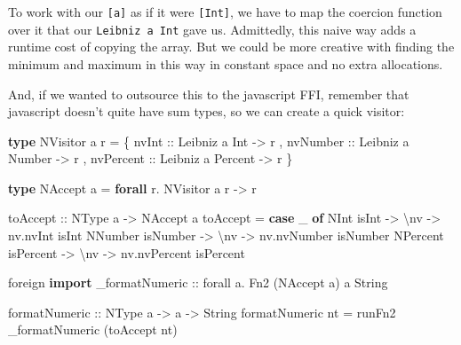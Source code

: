 \documentclass[]{article}
\newenvironment{Shaded}{}{}
\newcommand{\DataTypeTok}[1]{\textcolor[rgb]{0.56,0.13,0.00}{#1}}
\newcommand{\KeywordTok}[1]{\textcolor[rgb]{0.00,0.44,0.13}{\textbf{#1}}}
\newcommand{\NormalTok}[1]{#1}
\newcommand{\OperatorTok}[1]{\textcolor[rgb]{0.40,0.40,0.40}{#1}}
\newcommand{\OtherTok}[1]{\textcolor[rgb]{0.00,0.44,0.13}{#1}}
\begin{document}
To work with our \texttt{{[}a{]}} as if it were \texttt{{[}Int{]}}, we have to
map the coercion function over it that our \texttt{Leibniz\ a\ Int} gave us.
Admittedly, this naive way adds a runtime cost of copying the array. But we
could be more creative with finding the minimum and maximum in this way in
constant space and no extra allocations.

And, if we wanted to outsource this to the javascript FFI, remember that
javascript doesn't quite have sum types, so we can create a quick visitor:

\begin{Shaded}
\begin{Highlighting}[]
\KeywordTok{type} \DataTypeTok{NVisitor}\NormalTok{ a r }\OtherTok{=}
\NormalTok{    \{}\OtherTok{ nvInt ::} \DataTypeTok{Leibniz}\NormalTok{ a }\DataTypeTok{Int} \OtherTok{{-}\textgreater{}}\NormalTok{ r}
\NormalTok{    ,}\OtherTok{ nvNumber ::} \DataTypeTok{Leibniz}\NormalTok{ a }\DataTypeTok{Number} \OtherTok{{-}\textgreater{}}\NormalTok{ r}
\NormalTok{    ,}\OtherTok{ nvPercent ::} \DataTypeTok{Leibniz}\NormalTok{ a }\DataTypeTok{Percent} \OtherTok{{-}\textgreater{}}\NormalTok{ r}
\NormalTok{    \}}

\KeywordTok{type} \DataTypeTok{NAccept}\NormalTok{ a }\OtherTok{=} \KeywordTok{forall}\NormalTok{ r}\OperatorTok{.} \DataTypeTok{NVisitor}\NormalTok{ a r }\OtherTok{{-}\textgreater{}}\NormalTok{ r}

\OtherTok{toAccept ::} \DataTypeTok{NType}\NormalTok{ a }\OtherTok{{-}\textgreater{}} \DataTypeTok{NAccept}\NormalTok{ a}
\NormalTok{toAccept }\OtherTok{=} \KeywordTok{case}\NormalTok{ \_ }\KeywordTok{of}
    \DataTypeTok{NInt}\NormalTok{ isInt }\OtherTok{{-}\textgreater{}}\NormalTok{ \textbackslash{}nv }\OtherTok{{-}\textgreater{}}\NormalTok{ nv}\OperatorTok{.}\NormalTok{nvInt isInt}
    \DataTypeTok{NNumber}\NormalTok{ isNumber }\OtherTok{{-}\textgreater{}}\NormalTok{ \textbackslash{}nv }\OtherTok{{-}\textgreater{}}\NormalTok{ nv}\OperatorTok{.}\NormalTok{nvNumber isNumber}
    \DataTypeTok{NPercent}\NormalTok{ isPercent }\OtherTok{{-}\textgreater{}}\NormalTok{ \textbackslash{}nv }\OtherTok{{-}\textgreater{}}\NormalTok{ nv}\OperatorTok{.}\NormalTok{nvPercent isPercent}

\NormalTok{foreign }\KeywordTok{import}\NormalTok{ \_formatNumeric :: forall a. }\DataTypeTok{Fn2}\NormalTok{ (}\DataTypeTok{NAccept}\NormalTok{ a) a }\DataTypeTok{String}

\OtherTok{formatNumeric ::} \DataTypeTok{NType}\NormalTok{ a }\OtherTok{{-}\textgreater{}}\NormalTok{ a }\OtherTok{{-}\textgreater{}} \DataTypeTok{String}
\NormalTok{formatNumeric nt }\OtherTok{=}\NormalTok{ runFn2 \_formatNumeric (toAccept nt)}
\end{Highlighting}
\end{Shaded}
\end{document}
